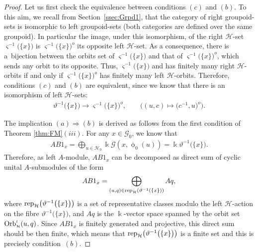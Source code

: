 \documentclass[pdftex]{sigma}
\numberwithin{equation}{section}
\newcommand{\Go}{\cG_{\Sscript{0}}}
\newcommand{\Ho}{\cH_{\Sscript{0}}}
\newcommand{\cG}{{\mathcal G}}
\newcommand{\cH}{{\mathcal H}}
\newcommand{\Sscript}[1]{\scriptscriptstyle{#1}}
\newcommand{\phio}{\upphi_{\Sscript{0}}}
\begin{document}
\begin{proof}Let us first check the equivalence between conditions $(c)$ and $(b)$. To this aim, we recall from Section~\ref{ssec:Grpd1}, that the category of right groupoid-sets is isomorphic to left groupoid-sets (both categories are defined over the same groupoid). In particular the image, under this isomorphism, of the right $\cH$-set $\varsigma^{-1}\big( \{x\} \big)$ is $\varsigma^{-1}\big( \{x\} \big)^{\Sscript{o}}$ its opposite left $\cH$-set. As a consequence, there is a~bijection between the orbits set of $\varsigma^{-1}\big( \{x\} \big)$ and that of $\varsigma^{-1}\big( \{x\} \big)^{\Sscript{o}}$, which sends any orbit to its opposite.
Thus, $\varsigma^{-1}\big( \{x\} \big)$ and has finitely many right $\cH$-orbits if and only if $\varsigma^{-1}\big( \{x\} \big)^{\Sscript{o}}$ has finitely many left $\cH$-orbits. Therefore, conditions $(c)$ and $(b)$ are equivalent, since we know that there is an isomorphism of left $\cH$-sets:
\begin{gather}\label{Eq:TS}
\vartheta^{-1}\big( \{x\} \big) \longrightarrow \varsigma^{-1}\big( \{x\} \big)^{\Sscript{o}}, \qquad \big( (u,c) \longmapsto \big(c^{-1},u\big)^{\Sscript{o}} \big).
\end{gather}

The implication $(a) \Rightarrow (b)$ is derived as follows from the first condition of Theorem \ref{thm:FM}$(iii)$. For any $x \in \Go$, we know that
\begin{gather*}
AB1_{x}=\bigoplus_{u \in \Ho} \Bbbk \cG(x, \phio(u))= \Bbbk \vartheta^{-1}\big( \{x\}\big).
\end{gather*}
Therefore, as left $A$-module, $AB1_{x}$ can be decomposed as direct sum of cyclic unital $A$-sub\-mo\-du\-les of the form
\begin{gather*}
AB1_{x} = \bigoplus_{(u, q) \in {\rm rep}_{\cH}(\vartheta^{-1}( \{x\}))} A q,
\end{gather*}
where ${\rm rep}_{\cH}\big(\vartheta^{-1}\big( \{x\}\big)\big)$ is a set of representative classes modulo the left $\cH$-action on the fibre $\vartheta^{-1}\big( \{x\}\big)$, and $A q$ is the $\Bbbk$-vector space spanned by the orbit set ${\rm Orb}_{\Sscript{\cH}}^{\Sscript{l}}(u,q)$. Since $AB1_{x}$ is finitely generated and projective, this direct sum should be then finite, which means that ${\rm rep}_{\cH}\big(\vartheta^{-1}\big(
\{x\}\big)\big)$ is a finite set and this is precisely condition~$(b)$.


\end{proof}
\end{document}
